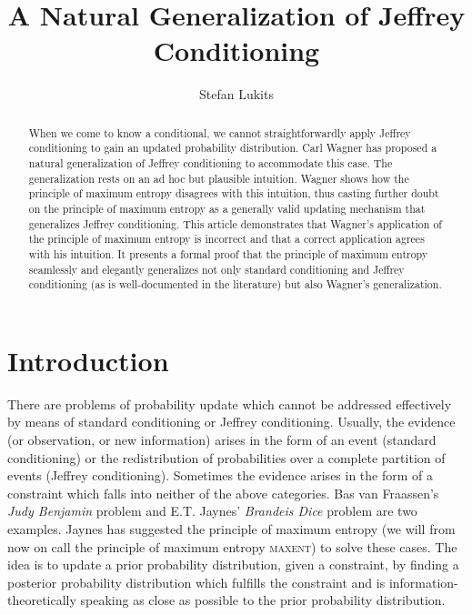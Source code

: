 \documentclass[11pt]{article}
\begin{document}

\title{A Natural Generalization of Jeffrey Conditioning}
\author{Stefan Lukits}

\date{}

\maketitle


\begin{abstract} 
  {\noindent}When we come to know a conditional, we cannot
  straightforwardly apply Jeffrey conditioning to gain an updated
  probability distribution. Carl Wagner has proposed a natural
  generalization of Jeffrey conditioning to accommodate this case. The
  generalization rests on an ad hoc but plausible intuition. Wagner
  shows how the principle of maximum entropy disagrees with this
  intuition, thus casting further doubt on the principle of maximum
  entropy as a generally valid updating mechanism that generalizes
  Jeffrey conditioning. This article demonstrates that Wagner's
  application of the principle of maximum entropy is incorrect and
  that a correct application agrees with his intuition. It presents a
  formal proof that the principle of maximum entropy seamlessly and
  elegantly generalizes not only standard conditioning and Jeffrey
  conditioning (as is well-documented in the literature) but also
  Wagner's generalization.
\end{abstract}

\section{Introduction}
\label{Introduction}

There are problems of probability update which cannot be addressed
effectively by means of standard conditioning or Jeffrey conditioning.
Usually, the evidence (or observation, or new information) arises in
the form of an event (standard conditioning) or the redistribution of
probabilities over a complete partition of events (Jeffrey
conditioning). Sometimes the evidence arises in the form of a
constraint which falls into neither of the above categories. Bas van
Fraassen's \emph{Judy Benjamin} problem and E.T. Jaynes'
\emph{Brandeis Dice} problem are two examples. Jaynes has suggested
the principle of maximum entropy (we will from now on call the
principle of maximum entropy \textsc{maxent}) to solve these cases.
The idea is to update a prior probability distribution, given a
constraint, by finding a posterior probability distribution which
fulfills the constraint and is information-theoretically speaking as
close as possible to the prior probability distribution.
\end{document}
